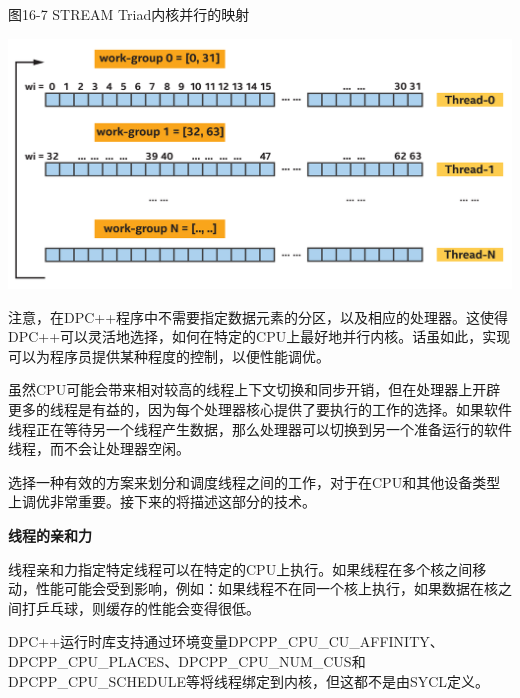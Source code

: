 \hspace*{\fill} \par %
图16-7 STREAM Triad内核并行的映射
\begin{center}
	\includegraphics[width=1.0\textwidth]{content/chapter-16/images/5}
\end{center}

注意，在DPC++程序中不需要指定数据元素的分区，以及相应的处理器。这使得DPC++可以灵活地选择，如何在特定的CPU上最好地并行内核。话虽如此，实现可以为程序员提供某种程度的控制，以便性能调优。\par

虽然CPU可能会带来相对较高的线程上下文切换和同步开销，但在处理器上开辟更多的线程是有益的，因为每个处理器核心提供了要执行的工作的选择。如果软件线程正在等待另一个线程产生数据，那么处理器可以切换到另一个准备运行的软件线程，而不会让处理器空闲。\par

\begin{tcolorbox}[colback=blue!5!white,colframe=blue!75!black, title=选择如何绑定和调度线程]
选择一种有效的方案来划分和调度线程之间的工作，对于在CPU和其他设备类型上调优非常重要。接下来的将描述这部分的技术。
\end{tcolorbox}

\hspace*{\fill} \par %
\textbf{线程的亲和力}

线程亲和力指定特定线程可以在特定的CPU上执行。如果线程在多个核之间移动，性能可能会受到影响，例如：如果线程不在同一个核上执行，如果数据在核之间打乒乓球，则缓存的性能会变得很低。\par

DPC++运行时库支持通过环境变量DPCPP\_CPU\_CU\_AFFINITY、DPCPP\_CPU\_PLACES、DPCPP\_CPU\_NUM\_CUS和DPCPP\_CPU\_SCHEDULE等将线程绑定到内核，但这都不是由SYCL定义。\par

